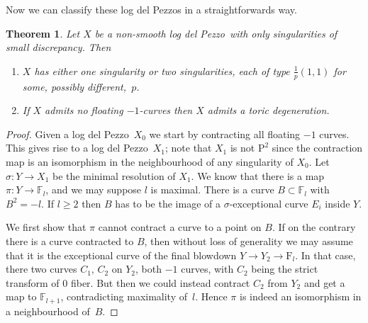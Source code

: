 \documentclass[11pt]{amsbook}
\theoremstyle{plain}
\newtheorem{thm}{Theorem}[section]
\newcommand{\ldp}{log del Pezzo}
\newcommand{\mb}[1]{\mathbb{#1}}
\newcommand{\F}{\mathrm{F}}
\renewcommand{\P}{\mathrm{P}}
\begin{document}
Now we can classify these log del Pezzos in a straightforwards way. 
\begin{thm}\label{ThmOnSing}
Let $X$ be a non-smooth \ldp\ with only singularities of small discrepancy. Then 
\begin{enumerate}
\item\label{thm38i}
$X$ has either one singularity or two singularities, each of type $\frac{1}p(1,1)$ for some, possibly different,~$p$.
\item\label{thm38ii}
If $X$ admits no floating $-1$-curves then $X$ admits a toric degeneration. %
\end{enumerate}
\end{thm}
\begin{proof}
Given a \ldp\ $X_0$ we start by contracting all floating $-1$ curves. This gives rise to a \ldp\ $X_1$; note that $X_1$ is not $\P^2$ since the contraction map is an isomorphism in the neighbourhood of any singularity of $X_0$. Let $\sigma\colon Y\rightarrow X_1$ be the minimal resolution of $X_1$. We know that there is a map $\pi \colon Y \rightarrow \mathbb{F}_l$, and we may suppose $l$ is maximal.
There is a curve $B \subset \mathbb{F}_l$ with $B^2 = -l$. 
If $l\ge2$ then $B$ has to be the image of a $\sigma$-exceptional curve $E_i$ inside $Y$.

We first show that $\pi$ cannot contract a curve to a point on $B$.
If on the contrary there is a curve contracted to $B$, then
without loss of generality we may assume that it is the exceptional curve of the final blowdown $Y\rightarrow Y_2\rightarrow\F_l$. In that case, there two curves $C_1, \, C_2$ on $Y_2$, both $-1$ curves, with $C_2$ being the strict transform of $0$ fiber. But then we could instead contract $C_2$ from $Y_2$ and get a map to $\mb{F}_{l+1}$, contradicting maximality of~$l$. 
Hence $\pi$ is indeed an isomorphism in a neighbourhood of~$B$.



\end{proof}
\end{document}
